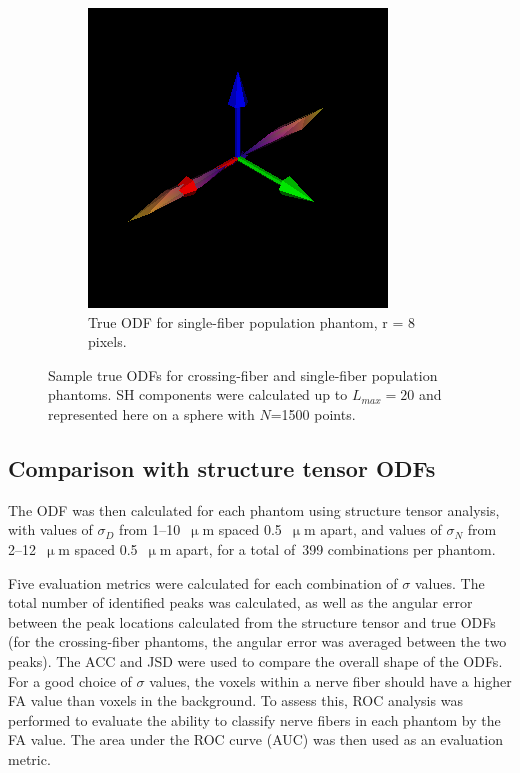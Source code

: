 \documentclass[11pt]{article}
\begin{document}
\begin{figure}[h]
\begin{subfigure}[t]{0.35\textwidth}
    \includegraphics[width=0.9\linewidth]{figs/r8_ODF}
    \caption{True ODF for single-fiber population phantom, r = 8 pixels.}
    \label{fig:r8odf}
  \end{subfigure}
  \captionsetup{width=0.7\textwidth}
  \caption{Sample true ODFs for crossing-fiber and single-fiber population
    phantoms.  SH components were calculated up to $L_{max}=20$ and represented
    here on a sphere with $N$=1500 points.}
  \label{fig:true_odfs}
\end{figure}

\subsection{Comparison with structure tensor ODFs}
The ODF was then calculated for each phantom using structure tensor analysis,
with values of $\sigma_D$ from 1--10~$\upmu$m spaced 0.5~$\upmu$m apart,
and values of $\sigma_N$ from 2--12~$\upmu$m spaced 0.5~$\upmu$m apart, for a total
of~399 combinations per phantom.

Five evaluation metrics were calculated for each combination of $\sigma$
values. The total number of identified peaks was calculated, as well as the
angular error between the peak locations calculated from the structure tensor
and true ODFs (for the crossing-fiber phantoms, the angular error was averaged
between the two peaks).  The ACC and JSD were used to compare the overall shape
of the ODFs. For a good choice of $\sigma$ values, the voxels within a nerve
fiber should have a higher FA value than voxels in the background. To assess
this, ROC analysis was performed to evaluate the ability to classify nerve
fibers in each phantom by the FA value. The area under the ROC curve (AUC) was
then used as an evaluation metric.
\end{document}
